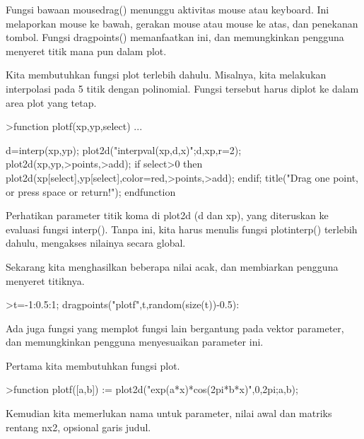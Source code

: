 \documentclass[a4paper,10pt]{article}
\begin{document}
\begin{eulernotebook}
\begin{eulercomment}
\begin{eulercomment}
\begin{eulercomment}
\begin{eulercomment}
\begin{eulercomment}
Fungsi bawaan mousedrag() menunggu aktivitas mouse atau keyboard. Ini
melaporkan mouse ke bawah, gerakan mouse atau mouse ke atas, dan
penekanan tombol. Fungsi dragpoints() memanfaatkan ini, dan
memungkinkan pengguna menyeret titik mana pun dalam plot.

Kita membutuhkan fungsi plot terlebih dahulu. Misalnya, kita melakukan
interpolasi pada 5 titik dengan polinomial. Fungsi tersebut harus
diplot ke dalam area plot yang tetap.
\end{eulercomment}
\begin{eulerprompt}
>function plotf(xp,yp,select) ...
\end{eulerprompt}
\begin{eulerudf}
    d=interp(xp,yp);
    plot2d("interpval(xp,d,x)";d,xp,r=2);
    plot2d(xp,yp,>points,>add);
    if select>0 then
      plot2d(xp[select],yp[select],color=red,>points,>add);
    endif;
    title("Drag one point, or press space or return!");
  endfunction
\end{eulerudf}
\begin{eulercomment}
Perhatikan parameter titik koma di plot2d (d dan xp), yang diteruskan
ke evaluasi fungsi interp(). Tanpa ini, kita harus menulis fungsi
plotinterp() terlebih dahulu, mengakses nilainya secara global.

Sekarang kita menghasilkan beberapa nilai acak, dan membiarkan
pengguna menyeret titiknya.
\end{eulercomment}
\begin{eulerprompt}
>t=-1:0.5:1; dragpoints("plotf",t,random(size(t))-0.5):
\end{eulerprompt}
\begin{eulercomment}
Ada juga fungsi yang memplot fungsi lain bergantung pada vektor
parameter, dan memungkinkan pengguna menyesuaikan parameter ini.

Pertama kita membutuhkan fungsi plot.
\end{eulercomment}
\begin{eulerprompt}
>function plotf([a,b]) := plot2d("exp(a*x)*cos(2pi*b*x)",0,2pi;a,b);
\end{eulerprompt}
\begin{eulercomment}
Kemudian kita memerlukan nama untuk parameter, nilai awal dan matriks
rentang nx2, opsional garis judul.


\end{eulercomment}
\end{eulercomment}
\end{eulercomment}
\end{eulercomment}
\end{eulercomment}
\end{eulernotebook}
\end{document}
